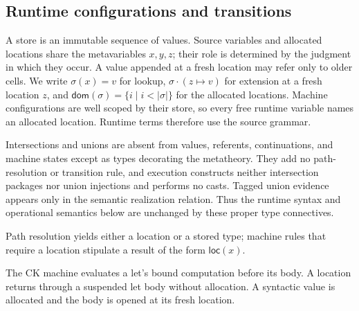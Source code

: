 \documentclass[acmsmall,screen,nonacm]{acmart}
\newcommand{\loc}[1]{\mathsf{loc}(#1)}
\newcommand{\rulesetup}{%
  \small
  \smallrulenames
  \setlength{\afterruleskip}{2em plus 0.2em minus 0.1em}%
  \setlength{\labelminsep}{0.6em}%
  \renewcommand{\arraystretch}{1.15}%
  \renewcommand{\andalso}{\qquad}%
}
\begin{document}
\subsection{Runtime configurations and transitions}
\label{sec:machine}

A store is an immutable sequence of values. Source variables and allocated
locations share the metavariables \(x,y,z\); their role is determined by the
judgment in which they occur. A value appended at a fresh location may refer
only to older cells. We write \(\sigma(x)=v\) for lookup,
\(\sigma\mathbin{\cdot}(z\mapsto v)\) for extension at a fresh location
\(z\), and
\(\mathsf{dom}(\sigma)=\{i\mid i<|\sigma|\}\) for the allocated locations.
Machine configurations are well scoped by their store, so every free runtime
variable names an allocated location. Runtime terms therefore use the source
grammar.

Intersections and unions are absent from values, referents, continuations, and
machine states except as types decorating the metatheory. They add no
path-resolution or transition rule, and execution constructs neither
intersection packages nor union injections and performs no casts. Tagged
union evidence appears only in the semantic realization relation. Thus the
runtime syntax and operational semantics below are unchanged by these proper
type connectives.

Path resolution yields either a location or a stored type; machine rules that
require a location stipulate a result of the form \(\loc{x}\).

The CK machine evaluates a let's bound computation before its body. A location
returns through a suspended let body without allocation. A syntactic value is
allocated and the body is opened at its fresh location.

\clearpage
\begingroup
\setlength{\abovedisplayskip}{5pt plus 1pt minus 1pt}
\setlength{\belowdisplayskip}{5pt plus 1pt minus 1pt}
\setlength{\intextsep}{4pt}
\captionsetup{skip=6pt}
\rulesetup
\setlength{\afterruleskip}{0.3em plus 0.06em minus 0.03em}
\end{document}
